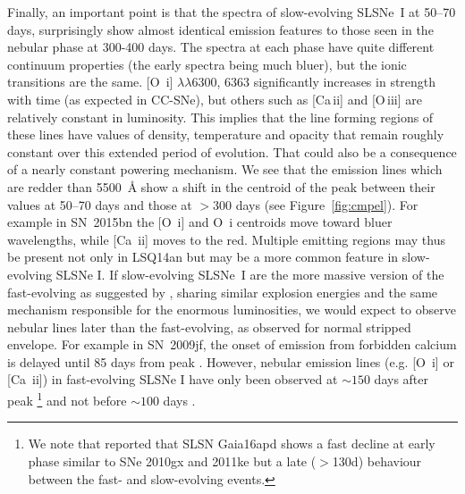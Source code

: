 \documentclass[useAMS,usenatbib]{mn2e}
\def\an{LSQ14an}
\begin{document}
Finally, an important point is that the spectra of slow-evolving SLSNe~I at 50--70 days, surprisingly show 
almost identical emission features to those seen in the nebular phase at 300-400 days. The spectra at each phase
have quite different continuum properties (the early spectra being much bluer), but the ionic transitions are the same. 
 [O~{\sc i}] $\lambda\lambda$6300, 6363 significantly increases in strength with time (as expected in CC-SNe), but
others such as [Ca\,{\sc ii}] and [O\,{\sc iii}] are relatively constant in luminosity. 
This implies that the line forming regions of these lines have values of density, temperature and opacity that 
remain roughly constant over this extended period of evolution. That could also be a consequence of a nearly constant powering mechanism.
We see that the emission lines which are redder than 5500~\AA\/ show a shift in the centroid of the peak 
between their values at 
50--70 days  and those at $>$300 days (see Figure~\ref{fig:cmpel}). For example in SN~2015bn the [O~{\sc i}] and O~{\sc i} centroids move toward bluer wavelengths, while [Ca~{\sc ii}] moves to the red. 
Multiple emitting regions may thus be present not only in \an\/ but may be a more common feature in slow-evolving SLSNe I. If slow-evolving SLSNe~I are the more massive version of the fast-evolving as suggested by \citet{ni15}, sharing similar explosion energies and the same mechanism responsible for the enormous luminosities, we would expect to observe nebular lines later than the fast-evolving, as observed for normal stripped envelope. For example  in SN~2009jf, the onset of 
emission from forbidden calcium is delayed until  85 days from peak \citep{va11}. 
However, nebular emission lines (e.g. [O~{\sc i}] or [Ca~{\sc ii}]) in fast-evolving SLSNe I have only been observed at $\sim150$ days after peak \citep{kan16}\footnote{We note that \citet{kan16} reported that SLSN Gaia16apd shows a fast decline at early phase similar to SNe 2010gx and 2011ke but a late ($>$130d) behaviour between the fast- and slow-evolving events.} and not before $\sim100$ days \citep{qu11,in13}. 
\end{document}

